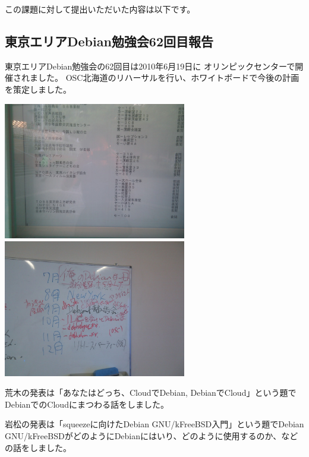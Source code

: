 \documentclass[mingoth,a4paper]{jsarticle}
\begin{document}
この課題に対して提出いただいた内容は以下です。



\subsection{東京エリアDebian勉強会62回目報告}

東京エリアDebian勉強会の62回目は2010年6月19日に
オリンピックセンターで開催されました。
OSC北海道のリハーサルを行い、ホワイトボードで今後の計画を策定しました。

\includegraphics[width=8cm]{image201007/debianmeeting1.jpg}
\includegraphics[width=8cm]{image201007/debianmeeting2.jpg}



荒木の発表は「あなたはどっち、CloudでDebian, DebianでCloud」という題でDebianでのCloudにまつわる話をしました。

岩松の発表は「squeezeに向けたDebian GNU/kFreeBSD入門」という題でDebian GNU/kFreeBSDがどのようにDebianにはいり、どのように使用するのか、などの話をしました。
\end{document}
